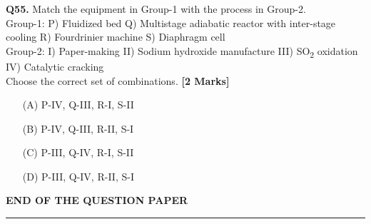 \documentclass[11pt]{article}
\newcommand{\questionb}[2]{
    \noindent\textbf{Q#2.} #1 \hfill \textbf{[2 Marks]}
}
\begin{document}
\questionb{Match the equipment in Group-1 with the process in Group-2.  
\\ Group-1: P) Fluidized bed Q) Multistage adiabatic reactor with inter-stage cooling R) Fourdrinier machine S) Diaphragm cell  
\\ Group-2: I) Paper-making II) Sodium hydroxide manufacture III) SO\textsubscript{2} oxidation IV) Catalytic cracking  
\\ Choose the correct set of combinations.}{55}
\begin{enumerate}
    \item[(A)] P-IV, Q-III, R-I, S-II  
    \item[(B)] P-IV, Q-III, R-II, S-I  
    \item[(C)] P-III, Q-IV, R-I, S-II  
    \item[(D)] P-III, Q-IV, R-II, S-I  
\end{enumerate}
\vspace{0.5cm}
\vspace{5cm}
\begin{center}
\textbf{END OF THE QUESTION PAPER} \\
\rule{\textwidth}{0.5pt}
\end{center}
\end{document}
